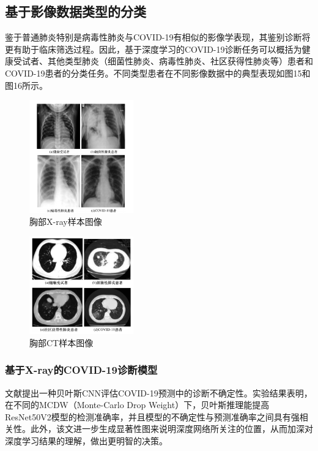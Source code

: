 \documentclass[journal,twoside,web]{ieeecolor}
\begin{document}
\subsection{基于影像数据类型的分类}
鉴于普通肺炎特别是病毒性肺炎与COVID-19有相似的影像学表现，其鉴别诊断将更有助于临床筛选过程。因此，基于深度学习的COVID-19诊断任务可以概括为健康受试者、其他类型肺炎（细菌性肺炎、病毒性肺炎、社区获得性肺炎等）患者和COVID-19患者的分类任务。不同类型患者在不同影像数据中的典型表现如图15和图16所示。
\begin{figure}[h]
\centering
\includegraphics[width=0.4\textwidth]{img/fig15.png}
\caption{胸部X-ray样本图像}
\label{fig:figure3}
\end{figure}
\begin{figure}[h]
\centering
\includegraphics[width=0.4\textwidth]{img/fig16.png}
\caption{胸部CT样本图像}
\label{fig:figure3}
\end{figure}
\subsubsection{基于X-ray的COVID-19诊断模型}

文献\cite{b20}提出一种贝叶斯CNN评估COVID-19预测中的诊断不确定性。实验结果表明，在不同的MCDW（Monte-Carlo Drop Weight）下，贝叶斯推理能提高ResNet50V2模型的检测准确率，并且模型的不确定性与预测准确率之间具有强相关性。此外，该文进一步生成显著性图来说明深度网络所关注的位置，从而加深对深度学习结果的理解，做出更明智的决策。
\end{document}
